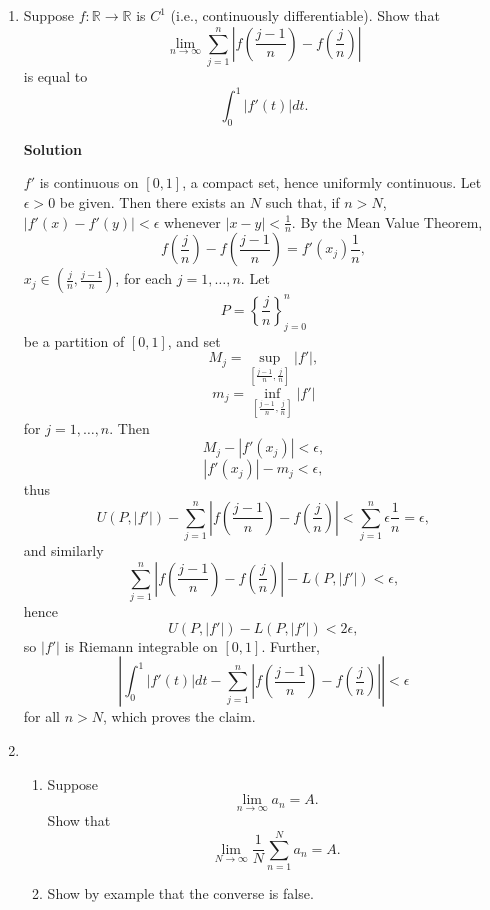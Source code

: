 \documentclass{article}
\begin{document}
\begin{enumerate}
\begin{enumerate}
\end{enumerate}



\item Suppose \(f : \mathbb{R} \to \mathbb{R}\) is \(C^1\) (i.e., continuously differentiable).  Show that
\[\lim_{n \to \infty} \sum_{j = 1}^n \left| f \left( \frac{j - 1}{n} \right) -
                                            f \left( \frac{j}{n} \right) \right|\]
is equal to
\[\int_0^1 |f'(t)| dt.\]

{\bf Solution}

\(f'\) is continuous on \([0,1]\), a compact set, hence uniformly continuous.  Let \(\epsilon > 0\) be given.  Then there exists an \(N\) such that, if \(n > N\), \(|f'(x) - f'(y)| < \epsilon\) whenever \(|x - y| < \frac{1}{n}\).  By the Mean Value Theorem,
\[f \left( \frac{j}{n} \right) - f \left( \frac{j - 1}{n} \right)
  = f'(x_j) \frac{1}{n},\]
\(x_j \in \left( \frac{j}{n}, \frac{j - 1}{n} \right)\), for each \(j = 1, \ldots, n\).  Let
\[P = \left\{ \frac{j}{n} \right\}_{j = 0}^{n}\]
be a partition of \([0,1]\), and set
\[M_j = \sup_{\left[ \frac{j - 1}{n}, \frac{j}{n} \right]} |f'|,\]
\[m_j = \inf_{\left[ \frac{j - 1}{n}, \frac{j}{n} \right]} |f'|\]
for \(j = 1, \ldots, n\).  Then
\[M_j - |f'(x_j)| < \epsilon,\]
\[|f'(x_j)| - m_j < \epsilon,\]
thus
\[U(P,|f'|) - \sum_{j = 1}^n \left| f \left( \frac{j - 1}{n} \right) -
                                 f \left( \frac{j}{n} \right) \right|
  < \sum_{j = 1}^n \epsilon \frac{1}{n}
  = \epsilon,\]
and similarly
\[\sum_{j = 1}^n \left| f \left( \frac{j - 1}{n} \right) -
                        f \left( \frac{j}{n} \right) \right| - L(P,|f'|)
  < \epsilon,\]
hence
\[U(P,|f'|) - L(P,|f'|) < 2\epsilon,\]
so \(|f'|\) is Riemann integrable on \([0,1]\).  Further,
\[\left| \int_0^1 |f'(t)| dt
  - \sum_{j = 1}^n \left| f \left( \frac{j - 1}{n} \right) -
                          f \left( \frac{j}{n} \right) \right|
  \right| < \epsilon\]
for all \(n > N\), which proves the claim.



\item

\begin{enumerate}
\item Suppose
\[\lim_{n \to \infty} a_n = A.\]
Show that
\[\lim_{N \to \infty} \frac{1}{N} \sum_{n = 1}^N a_n = A.\]

\item Show by example that the converse is false.

\end{enumerate}


\end{enumerate}
\end{document}
